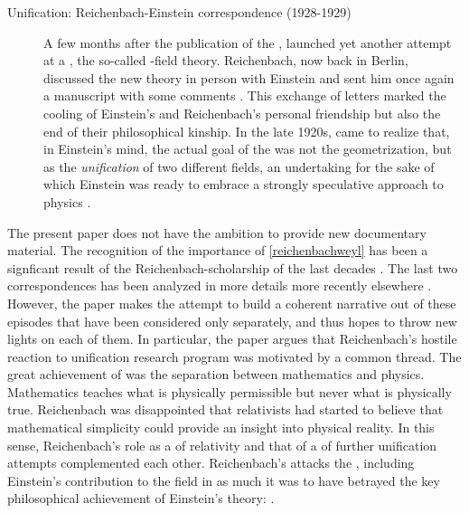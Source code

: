 \documentclass[draft]{article}
\newcommand{\PRZL}{\citetitle{Reichenbach1928}\xspace}
\newcommand{\FP}{\german{Fernparallelismus}\xspace}
\begin{document}
\begin{description}
\item[Unification: Reichenbach-Einstein correspondence (1928-1929)]\label{reichenbacheinsteinII}   A few months after the publication of the \PRZL \citep{Reichenbach1928}, \citet{Einstein19281,Einstein19282} launched yet another attempt at a \uft, the so-called \FP-field theory. Reichenbach, now back in Berlin, discussed the new theory in person with Einstein and sent him once again a manuscript with some comments \citep{Reichenbach1928b}. This exchange of letters marked the cooling of Einstein's and Reichenbach's personal friendship but also the end of their philosophical kinship. In the late 1920s, \citet{Reichenbach1929a,Reichenbach1929b,Reichenbach1929c} came to realize that, in Einstein's mind, the actual goal of the \uftp was not the geometrization, but as the \emph{unification} of two different fields, an undertaking for the sake of which Einstein was ready to embrace a strongly speculative approach to physics \citep{Dongen2010}.  
\end{description}

The present paper does not have the ambition to provide new documentary material. The recognition of the importance of \cref{reichenbachweyl} has been a signficant result of the Reichenbach-scholarship of the last decades \citep{Ryckman1995,Ryckman1996}. The last two correspondences has been analyzed in more details more recently elsewhere \citep{Giovanelli2016d,Giovanelli2022}. However, the paper makes the attempt to build a coherent narrative out of these episodes that have been considered only separately, and thus hopes to throw new lights on each of them. In particular, the paper argues that Reichenbach's hostile reaction to unification research program was motivated by a common thread. The great achievement of \gr was the separation between mathematics and physics. Mathematics teaches what is physically permissible but never what is physically true. Reichenbach was disappointed that relativists had started to believe that mathematical simplicity could provide an insight into physical reality. In this sense, Reichenbach's role as a  of relativity and that of a  of further unification attempts complemented each other. Reichenbach's attacks the \uftp, including Einstein's contribution to the field in as much it was to have betrayed the key philosophical achievement of Einstein's theory:  \citep[11]{Reichenbach1929}.   
\end{document}
